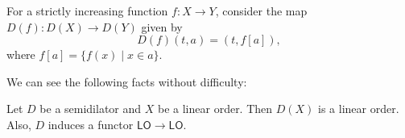 \documentclass{mhkr}
\newcommand{\LO}{\mathsf{LO}}
\newcommand{\ACA}{\mathsf{ACA}}
\def\bfcyrillic{\usefont{T2A}{antt}{eb}{n}}
\newcommand{\bfcyrDe}{{\text{\bfcyrillic \char"C4}}}
\begin{document}
\begin{definition}
    For a strictly increasing function $f\colon X\to Y$, consider the map $D(f)\colon D(X)\to D(Y)$ given by
    \begin{equation*}
        D(f)(t,a) = (t,f[a]),
    \end{equation*}
    where $f[a] = \{f(x) \mid x\in a\}$.
\end{definition}

We can see the following facts without difficulty:
\begin{proposition}[$\ACA_0$] \label{Proposition: Predilator is a functor}
    Let $D$ be a semidilator and $X$ be a linear order. Then $D(X)$ is a linear order. Also, $D$ induces a functor $\LO\to\LO$.
\end{proposition}

\end{document}
